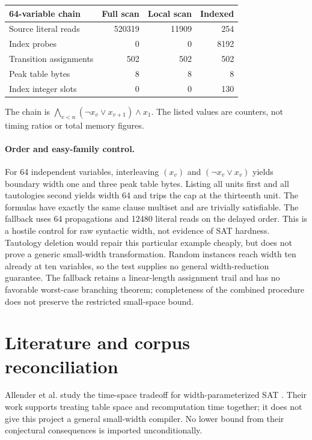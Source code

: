 \documentclass[11pt]{article}
\begin{document}
\begin{center}
\begin{tabular}{lrrr}
\toprule
64-variable chain & Full scan & Local scan & Indexed\\
\midrule
Source literal reads & 520319 & 11909 & 254\\
Index probes & 0 & 0 & 8192\\
Transition assignments & 502 & 502 & 502\\
Peak table bytes & 8 & 8 & 8\\
Index integer slots & 0 & 0 & 130\\
\bottomrule
\end{tabular}
\end{center}
The chain is $\bigwedge_{v<n}(\neg x_v\lor x_{v+1})\land x_1$.
The listed values are counters, not timing ratios or total memory figures.

\paragraph{Order and easy-family control.}
For 64 independent variables, interleaving $(x_v)$ and
$(\neg x_v\lor x_v)$ yields boundary width one and three peak table bytes.
Listing all units first and all tautologies second yields width 64 and trips
the cap at the thirteenth unit. The formulas have exactly the same clause
multiset and are trivially satisfiable. The fallback uses 64 propagations
and 12480 literal reads on the delayed order. This is a hostile control for
raw syntactic width, not evidence of SAT hardness. Tautology deletion would
repair this particular example cheaply, but does not prove a generic
small-width transformation. Random instances reach width ten already at ten
variables, so the test supplies no general width-reduction guarantee.
The fallback retains a linear-length assignment trail and has no favorable
worst-case branching theorem; completeness of the combined procedure does
not preserve the restricted small-space bound.

\section{Literature and corpus reconciliation}
Allender et al. study the time-space tradeoff for width-parameterized SAT
\cite{allender2014}. Their work supports treating table space and recomputation
time together; it does not give this project a general small-width compiler.
No lower bound from their conjectural consequences is imported unconditionally.
\end{document}
